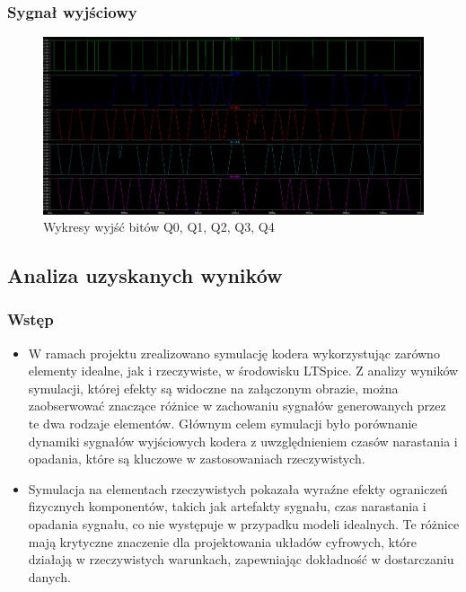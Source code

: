 \documentclass{article}
\begin{document}
\newpage

\subsubsection{Sygnał wyjściowy}
\begin{figure}[ht]
    \centering
    \begin{adjustbox}{center}
        \includegraphics[width=1.45\textwidth]{wyjsciowe-rzecz.png}
    \end{adjustbox}
    \caption{Wykresy wyjść bitów Q0, Q1, Q2, Q3, Q4}
    \label{fig:mojobrazek}
\end{figure}

\newpage

\subsection {Analiza uzyskanych wyników}
\subsubsection {Wstęp}
\begin{itemize}
\item W ramach projektu zrealizowano symulację kodera wykorzystując zarówno elementy idealne, jak i rzeczywiste, w środowisku LTSpice. Z analizy wyników symulacji, której efekty są widoczne na załączonym obrazie, można zaobserwować znaczące różnice w zachowaniu sygnałów generowanych przez te dwa rodzaje elementów. Głównym celem symulacji było porównanie dynamiki sygnałów wyjściowych kodera z uwzględnieniem czasów narastania i opadania, które są kluczowe w zastosowaniach rzeczywistych.

\item Symulacja na elementach rzeczywistych pokazała wyraźne efekty ograniczeń fizycznych komponentów, takich jak artefakty sygnału, czas narastania i opadania sygnału, co nie występuje w przypadku modeli idealnych. Te różnice mają krytyczne znaczenie dla projektowania układów cyfrowych, które działają w rzeczywistych warunkach, zapewniając dokładność w dostarczaniu danych.
\end{itemize}
\end{document}
